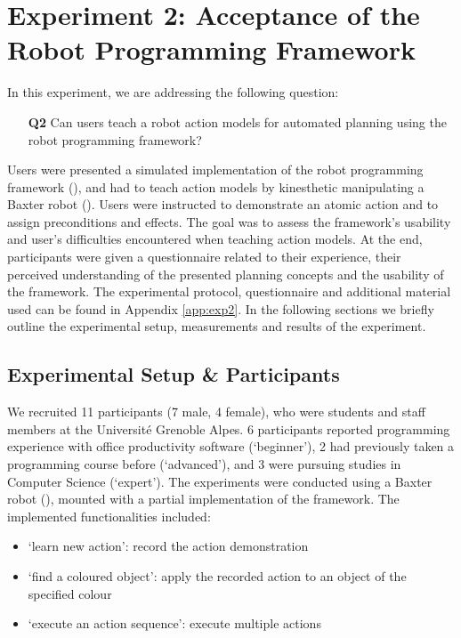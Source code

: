 \section{Experiment 2: Acceptance of the Robot Programming Framework}
\label{sec:Exp2}

In this experiment, we are addressing the following question:

\begin{enumerate}
  \item[\textbf{Q2}] Can users teach a robot action models for automated planning using the robot programming framework?
\end{enumerate}

Users were presented a simulated implementation of the robot programming framework (), and had to teach action models by kinesthetic manipulating a Baxter robot (). 
Users were instructed to demonstrate an atomic action and to assign preconditions and effects.
The goal was to assess the framework's usability and user's difficulties encountered when teaching action models.
At the end, participants were given a questionnaire related to their experience, their perceived understanding of the presented planning concepts and the usability of the framework.
The experimental protocol, questionnaire and additional material used can be found in Appendix \ref{app:exp2}.
In the following sections we briefly outline the experimental setup, measurements and results of the experiment.

\subsection{Experimental Setup \& Participants}
We recruited 11 participants (7 male, 4 female), who were students and staff members at the Universit\'{e} Grenoble Alpes. 
6 participants reported programming experience with office productivity software (`beginner'), 2 had previously taken a programming course before (`advanced'), and 3 were pursuing studies in Computer Science (`expert').
The experiments were conducted using a Baxter robot (), mounted with a partial implementation of the framework.
The implemented functionalities included:
\begin{itemize}
	\item `learn new action': record the action demonstration
	\item `find a coloured object': apply the recorded action to an object of the specified colour
	\item `execute an action sequence': execute multiple actions
\end{itemize}

